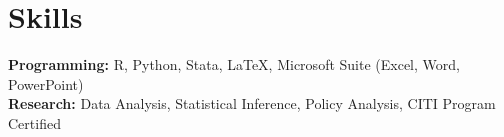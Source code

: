 \section{\sc Skills}
\textbf{Programming:} R, Python, Stata, \LaTeX, Microsoft Suite (Excel, Word, PowerPoint) \\
\textbf{Research:} Data Analysis, Statistical Inference,  Policy Analysis, CITI Program Certified \\

\endinput